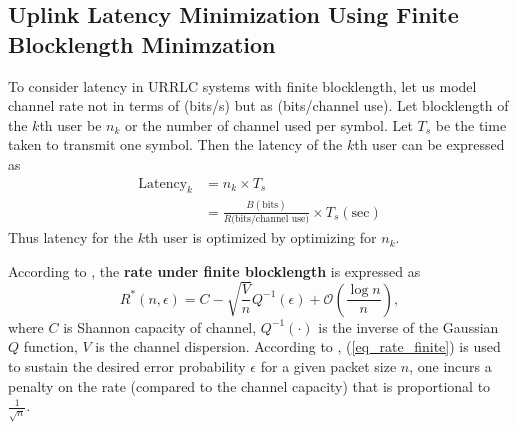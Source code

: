 \documentclass[a4paper, 12pt, onecolumn, journal, twoside, draftclsnofoot]{IEEEtran}
\begin{document}
\subsection{Uplink Latency Minimization Using Finite Blocklength Minimzation}
To consider latency in URRLC systems with finite blocklength, let us model channel rate not in terms of (bits/s) but as (bits/channel use).  Let blocklength of the $k$th user be $n_k$ or the number of channel used per symbol. Let $T_s$ be the time taken to transmit one symbol.  Then the latency of the $k$th user can be expressed as
\begin{equation*}
	\begin{split}
		\text{Latency}_k &= n_k \times T_s \\ 
		&= \frac{B (\text{bits})}{R\text{(bits/channel use)}} \times T_s (\text{sec})
\end{split}
\end{equation*}
Thus latency for the $k$th user is optimized by optimizing for $n_k$. 

According to \cite{durisi2016}, the \textbf{rate under finite blocklength} is expressed as
\begin{equation}
	R^*(n,\epsilon) = C - \sqrt{\frac{V}{n}}Q^{-1}(\epsilon) + \mathcal{O}\left(\frac{\log n}{n}\right), 
\label{eq_rate_finite}
\end{equation}
where $C$ is Shannon capacity of channel, $Q^{-1}(\cdot)$ is the inverse of the Gaussian $Q$ function, $V$ is the channel dispersion.  According to \cite{durisi2016}, (\ref{eq_rate_finite})  is used to sustain the desired error probability $\epsilon$ for a given packet size $n$, one incurs a penalty on the rate (compared to the channel capacity) that is proportional to $\frac{1}{\sqrt{n}}$.
\end{document}
